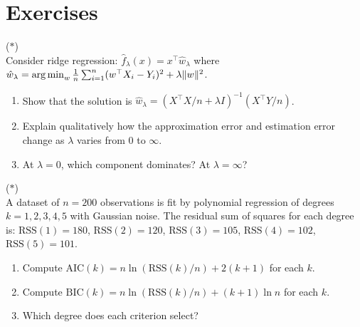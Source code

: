 \documentclass[11pt,a4paper]{article}
\begin{document}

\section{Exercises}
\label{sec:exercises}

\begin{exercise}
\textnormal{(\(\ast\))} \\
Consider ridge regression: $\hat{f}_\lambda(x) = x^\top
\hat{w}_\lambda$ where
$\hat{w}_\lambda = \operatorname{arg\,min}_w \frac{1}{n}\sum_{i=1}^n
(w^\top X_i - Y_i)^2 + \lambda \|w\|^2$.
\begin{enumerate}[nosep,label=(\alph*)]
    \item Show that the solution is
    $\hat{w}_\lambda = (X^\top X/n + \lambda I)^{-1}(X^\top Y/n)$.
    \item Explain qualitatively how the approximation error and
    estimation error change as $\lambda$ varies from $0$ to $\infty$.
    \item At $\lambda = 0$, which component dominates?  At
    $\lambda = \infty$?
\end{enumerate}
\end{exercise}

\begin{exercise}
\textnormal{(\(\ast\))} \\
A dataset of $n = 200$ observations is fit by polynomial regression
of degrees $k = 1, 2, 3, 4, 5$ with Gaussian noise.  The residual
sum of squares for each degree is:
$\mathrm{RSS}(1) = 180$, $\mathrm{RSS}(2) = 120$,
$\mathrm{RSS}(3) = 105$, $\mathrm{RSS}(4) = 102$,
$\mathrm{RSS}(5) = 101$.
\begin{enumerate}[nosep,label=(\alph*)]
    \item Compute $\mathrm{AIC}(k) = n\ln(\mathrm{RSS}(k)/n)
    + 2(k+1)$ for each $k$.
    \item Compute $\mathrm{BIC}(k) = n\ln(\mathrm{RSS}(k)/n)
    + (k+1)\ln n$ for each $k$.
    \item Which degree does each criterion select?
\end{enumerate}
\end{exercise}
\end{document}
